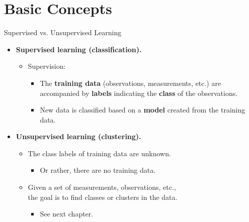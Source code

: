 \section{Basic Concepts}

\begin{frame}{Supervised vs. Unsupervised Learning}
	\begin{itemize}
		\item \textbf{\color{airforceblue}Supervised learning (classification).}
		      \begin{itemize}
			      \item Supervision:
			            \begin{itemize}
				            \item The \textbf{training data} (observations, measurements, etc.) are accompanied by \textbf{labels} indicating the \textbf{class} of the observations.
				            \item New data is classified based on a \textbf{model} created from the training data.
			            \end{itemize}
		      \end{itemize}
		\item \textbf{\color{airforceblue}Unsupervised learning (clustering).}
		      \begin{itemize}
			      \item The class labels of training data are unknown.
			            \begin{itemize}
				            \item Or rather, there are no training data.
			            \end{itemize}
		      \end{itemize}
		      \begin{itemize}
			      \item Given a set of measurements, observations, etc., \\ the goal is to find classes or clusters in the data.
			            \begin{itemize}
				            \item See next chapter.
			            \end{itemize}
		      \end{itemize}
	\end{itemize}
\end{frame}

